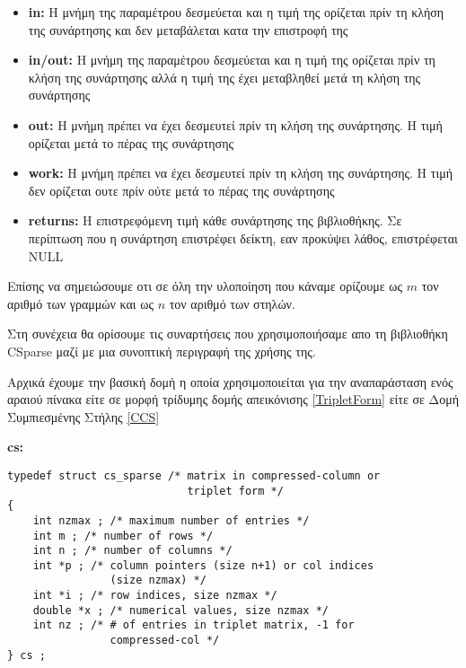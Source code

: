 \begin{itemize}
  \item \textbf{in:}  Η μνήμη της παραμέτρου δεσμεύεται και η τιμή της ορίζεται πρίν τη κλήση της συνάρτησης και δεν μεταβάλεται κατα την επιστροφή της 
  \item \textbf{in/out:}  Η μνήμη της παραμέτρου δεσμεύεται και η τιμή της ορίζεται πρίν τη κλήση της συνάρτησης αλλά η τιμή της έχει μεταβληθεί μετά τη κλήση της συνάρτησης 
  \item \textbf{out:}  Η μνήμη πρέπει να έχει δεσμευτεί πρίν τη κλήση της συνάρτησης. Η τιμή ορίζεται μετά το πέρας της συνάρτησης 
  \item \textbf{work:}   Η μνήμη πρέπει να έχει δεσμευτεί πρίν τη κλήση της συνάρτησης. Η τιμή δεν ορίζεται ουτε πρίν ούτε μετά το πέρας της συνάρτησης  
  \item \textbf{returns:}  Η επιστρεφόμενη τιμή κάθε συνάρτησης της βιβλιοθήκης. Σε περίπτωση που η συνάρτηση επιστρέφει δείκτη, εαν προκύψει λάθος, επιστρέφεται NULL
\end{itemize}

 Επίσης να σημειώσουμε οτι σε όλη την υλοποίηση που κάναμε ορίζουμε ως $m$ τον αριθμό των γραμμών και ως $n$ τον αριθμό των στηλών.

Στη συνέχεια θα ορίσουμε τις συναρτήσεις που χρησιμοποιήσαμε απο τη βιβλιοθήκη CSparse μαζί με μια συνοπτική περιγραφή της χρήσης της.

Αρχικά έχουμε την βασική δομή η οποία χρησιμοποιείται για την αναπαράσταση ενός αραιού πίνακα είτε σε μορφή τρίδυμης δομής απεικόνισης \ref{TripletForm} είτε σε Δομή Συμπιεσμένης Στήλης \ref{CCS}

\textbf{cs:}
\begin{verbatim}
typedef struct cs_sparse /* matrix in compressed-column or
                            triplet form */
{
    int nzmax ; /* maximum number of entries */
    int m ; /* number of rows */
    int n ; /* number of columns */
    int *p ; /* column pointers (size n+1) or col indices
                (size nzmax) */
    int *i ; /* row indices, size nzmax */
    double *x ; /* numerical values, size nzmax */
    int nz ; /* # of entries in triplet matrix, -1 for
                compressed-col */
} cs ;
\end{verbatim}

